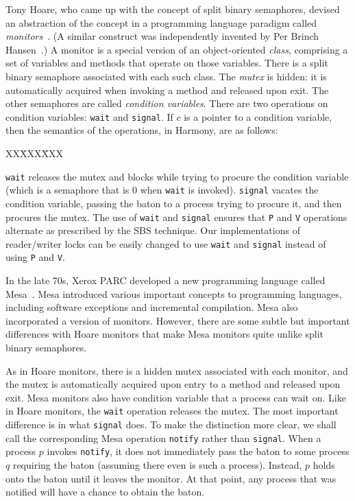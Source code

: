 \documentclass{report}
\newcommand{\harmonysource}[1]{
\begin{tabbing}
XX\=XXX\=XXX\kill
    
\end{tabbing}
}
\newenvironment{code}{
\tcolorbox
}{
\endtcolorbox
}
\begin{document}
Tony Hoare, who came up with the concept of split binary semaphores, devised
an abstraction of the concept in a programming language paradigm called
\emph{monitors}~\cite{Hoare74}.
%
(A similar construct was independently invented by Per Brinch Hansen~\cite{BH73}.)
A monitor is a special version of an object-oriented \emph{class}, comprising
a set of variables and methods that operate on those variables.
There is a split binary semaphore associated with each such class.
The \textit{mutex} is hidden: it is automatically acquired when invoking a
method and released upon exit.
The other semaphores are called \emph{condition variables}.
%
There are two operations on condition variables: \texttt{wait}
%
and
\texttt{signal}.
%
If $c$ is a pointer to a condition variable, then the semantics of the
operations, in Harmony, are as follows:

\begin{code}
\harmonysource{hoaremon}
\end{code}

\texttt{wait} releases the mutex and blocks while trying
to procure the condition variable (which is a semaphore that is 0 when
\texttt{wait} is invoked).
\texttt{signal} vacates the condition variable, passing the baton to
a process trying to procure it, and then procures the mutex.
The use of \texttt{wait} and \texttt{signal} ensures that \texttt{P} and
\texttt{V} operations alternate as prescribed by the SBS technique.
Our implementations of reader/writer locks can be easily changed to
use \texttt{wait} and \texttt{signal} instead of using \texttt{P}
and \texttt{V}.

In the late 70s, Xerox PARC developed a new programming language called
Mesa~\cite{LR80}.
%
Mesa introduced various important concepts to programming languages,
including software exceptions and incremental compilation.  Mesa also
incorporated a version of monitors.
However, there are some subtle but important differences with Hoare
monitors that make Mesa monitors quite unlike split binary semaphores.

As in Hoare monitors, there is a hidden mutex associated with each monitor,
and the mutex is automatically acquired upon entry to a method and released
upon exit.
Mesa monitors also have condition variable that a process can wait on.
Like in Hoare monitors, the \texttt{wait} operation releases the mutex.
The most important difference is in what \texttt{signal} does.
To make the distinction more clear, we shall call the corresponding Mesa
operation \texttt{notify} rather than \texttt{signal}.
%
When a process $p$ invokes \texttt{notify}, it does not immediately pass 
the baton to some process $q$ requiring the baton (assuming there even
is such a process).  Instead, $p$ holds onto
the baton until it leaves the monitor.  At that point, any process that
was notified will have a chance to obtain the baton.
\end{document}
